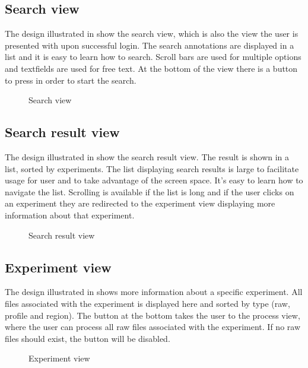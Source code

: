 \subsection{Search view}
The design illustrated in  show the search view, 
which is also the view the user is presented with upon successful login.
The search annotations are displayed in a list and it is easy to learn how to search.
Scroll bars are used for multiple options and textfields are used for free text. 
At the bottom of the view there is a button to press in order to start the search.

\begin{figure}[ht]
\caption{Search view}
\label{fig:and_search}
\end{figure}
\FloatBarrier

\subsection{Search result view}
The design illustrated in  show the search result view. 
The result is shown in a list, sorted by experiments. The list displaying search results is large to facilitate usage for user and to take advantage of the screen space. 
It's easy to learn how to navigate the list. 
Scrolling is available if the list is long and if the user clicks on an experiment they are redirected to the experiment view displaying more information about that experiment.

\begin{figure}[ht]
\caption{Search result view}
\label{fig:and_result}
\end{figure}
\FloatBarrier

\subsection{Experiment view}
The design illustrated in  shows more information about a specific experiment. 
All files associated with the experiment is displayed here and sorted by type (raw, profile and region).
The button  at the bottom takes the user to the process view, where the user can process all raw files associated with the experiment.
If no raw files should exist, the button will be disabled.

\begin{figure}[ht]
\caption{Experiment view}
\label{fig:and_experiment}
\end{figure}
\FloatBarrier

